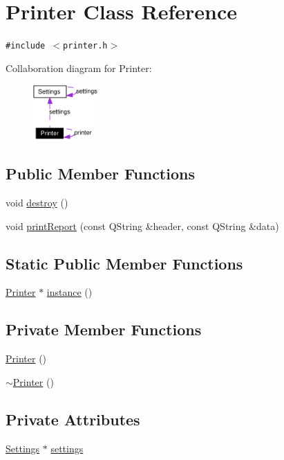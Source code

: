 \hypertarget{classPrinter}{
\section{Printer Class Reference}
\label{classPrinter}
}
{\tt \#include $<$printer.h$>$}

Collaboration diagram for Printer:\begin{figure}[H]
\begin{center}
\leavevmode
\includegraphics[width=71pt]{classPrinter__coll__graph}
\end{center}
\end{figure}
\subsection*{Public Member Functions}
\begin{CompactItemize}
\item 
void \hyperlink{classPrinter_a0}{destroy} ()
\item 
void \hyperlink{classPrinter_a1}{print\-Report} (const QString \&header, const QString \&data)
\end{CompactItemize}
\subsection*{Static Public Member Functions}
\begin{CompactItemize}
\item 
\hyperlink{classPrinter}{Printer} $\ast$ \hyperlink{classPrinter_e0}{instance} ()
\end{CompactItemize}
\subsection*{Private Member Functions}
\begin{CompactItemize}
\item 
\hyperlink{classPrinter_d0}{Printer} ()
\item 
\hyperlink{classPrinter_d1}{$\sim$Printer} ()
\end{CompactItemize}
\subsection*{Private Attributes}
\begin{CompactItemize}
\item 
\hyperlink{classSettings}{Settings} $\ast$ \hyperlink{classPrinter_r0}{settings}
\end{CompactItemize}

